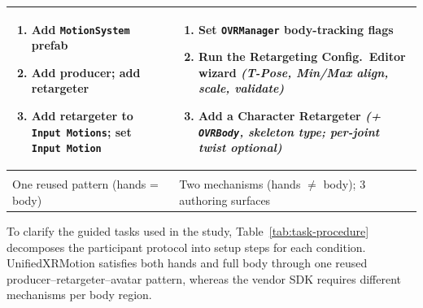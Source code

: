 \documentclass[runningheads]{llncs}
\newenvironment{cellsteps}
  {\begin{enumerate}[leftmargin=*,labelsep=0.4em,labelindent=0pt,
       topsep=0pt,partopsep=0pt,itemsep=0pt,parsep=0pt,label=\arabic*.]}
  {\end{enumerate}}
\begin{document}
\begin{table}[t]
\begin{tabularx}{\textwidth}{@{}>{\raggedright\arraybackslash}X >{\raggedright\arraybackslash}X@{}}
\begin{cellsteps}
		     \item Add \texttt{MotionSystem} prefab
		     \item Add producer; add retargeter
		     \item Add retargeter to \texttt{Input\,Motions}; set \texttt{Input\,Motion}
		   \end{cellsteps}
		 & \begin{cellsteps}
		     \item Set \texttt{OVRManager} body-tracking flags
		     \item Run the Retargeting Config.\ Editor wizard \textit{(T-Pose, Min/Max align, scale, validate)}
		     \item Add a Character Retargeter \textit{(+ \texttt{OVRBody}, skeleton type; per-joint twist optional)}
		   \end{cellsteps} \\
		\midrule
		\multicolumn{2}{@{}l}{\textbf{Pattern}} \\
		\addlinespace[1pt]
		One reused pattern (hands = body) & Two mechanisms (hands $\neq$ body); 3 authoring surfaces \\
		\bottomrule
	\end{tabularx}
\end{table}


	To clarify the guided tasks used in the study, Table~\ref{tab:task-procedure}
	decomposes the participant protocol into setup steps for each condition.
	UnifiedXRMotion satisfies both hands and full body through one reused
	producer--retargeter--avatar pattern, whereas the vendor SDK requires different
	mechanisms per body region.
\end{document}
